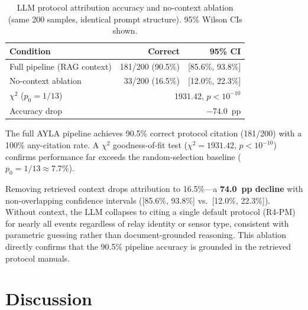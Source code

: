 \documentclass[twocolumn, 10pt, letterpaper]{article}
\begin{document}
\begin{table}[H]
\centering
\caption{LLM protocol attribution accuracy and no-context ablation
         (same 200 samples, identical prompt structure). 95\% Wilson CIs shown.}
\label{tab:llm_ablation}
\footnotesize
\setlength{\tabcolsep}{4pt}
\begin{tabular}{lrr}
\toprule
\textbf{Condition} & \textbf{Correct} & \textbf{95\% CI} \\
\midrule
Full pipeline (RAG context) & 181/200 (90.5\%) & [85.6\%, 93.8\%] \\
No-context ablation         &  33/200 (16.5\%) & [12.0\%, 22.3\%] \\
\midrule
$\chi^2$ ($p_0{=}1/13$) & \multicolumn{2}{r}{1931.42, $p < 10^{-10}$} \\
Accuracy drop & \multicolumn{2}{r}{$-74.0$~pp} \\
\bottomrule
\end{tabular}
\end{table}

The full AYLA pipeline achieves 90.5\% correct protocol citation (181/200) with a
100\% any-citation rate.
A $\chi^2$ goodness-of-fit test ($\chi^2 = 1931.42$, $p < 10^{-10}$) confirms
performance far exceeds the random-selection baseline ($p_0 = 1/13 \approx 7.7\%$).

Removing retrieved context drops attribution to 16.5\%---a \textbf{74.0~pp decline}
with non-overlapping confidence intervals
([85.6\%, 93.8\%] vs.\ [12.0\%, 22.3\%]).
Without context, the LLM collapses to citing a single default protocol (R4-PM)
for nearly all events regardless of relay identity or sensor type, consistent with
parametric guessing rather than document-grounded reasoning.
This ablation directly confirms that the 90.5\% pipeline accuracy is grounded in
the retrieved protocol manuals.

\section{Discussion}
\label{sec:discussion}
\end{document}
